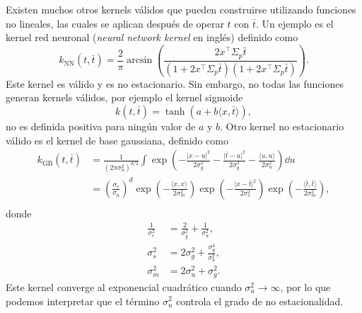 Existen muchos otros kernels válidos que pueden construirse utilizando funciones no lineales, las cuales se aplican después de operar \(t\) con \(\bar{t}\). Un ejemplo es el kernel red neuronal (\emph{neural network kernel} en inglés) definido como
\begin{equation*}
	k_{\mathrm{NN}}(t, \bar{t}) = \frac{2}{\pi} \arcsin \left(\frac{2x^{\top} \Sigma_{p}\bar{t}}{\left(1 + 2x^{\top} \Sigma_{p} \bar{t}\right) \left(1 + 2x^{\top} \Sigma_{p} \bar{t}\right)}\right).
\end{equation*}
Este kernel es válido y es no estacionario. Sin embargo, no todas las funciones generan kernels válidos, por ejemplo el kernel sigmoide
\begin{equation*}
	k(t, \bar{t}) = \tanh(a + b \langle x, \bar{t}\rangle),
\end{equation*}
no es definida positiva para ningún valor de \(a\) y \(b\). Otro kernel no estacionario válido es el kernel de base gaussiana, definido como
\begin{align*}
	k_{\mathrm{GB}}(t, \bar{t})	&= \frac{1}{(2\pi \sigma_u^2)^{d/2}} \int \exp\left(-\frac{\vert x-u \vert^2}{2\sigma_g^2} - \frac{\vert \bar{t}-u \vert^2}{2\sigma_g^2} -\frac{\langle u, u\rangle}{2\sigma_u^2}\right) \dd{u} \\
								&= \left(\frac{\sigma_e}{\sigma_u}\right)^d \exp\left(-\frac{\langle x, x \rangle}{2 \sigma_m^2}\right) \exp\left(-\frac{\vert x-\bar{t}\vert^2}{2\sigma_s^2}\right) \exp\left(-\frac{\langle \bar{t}, \bar{t}\rangle}{2\sigma_m^2}\right), \\
\end{align*}
donde
\begin{align*}
	\frac{1}{\sigma_{e}^{2}}	&=\frac{2}{\sigma_{g}^{2}}+\frac{1}{\sigma_{u}^{2}},\\
	\sigma_{s}^{2}				&= 2\sigma_{g}^{2}+\frac{\sigma_{g}^{4}}{\sigma_{u}^{2}},\\
	\sigma_{m}^{2}				&= 2\sigma_{u}^{2}+\sigma_{g}^{2}.
\end{align*}
Este kernel converge al exponencial cuadrático cuando \(\sigma_{u}^{2} \to \infty\), por lo que podemos interpretar que el término \(\sigma_{u}^{2}\) controla el grado de no estacionalidad.

